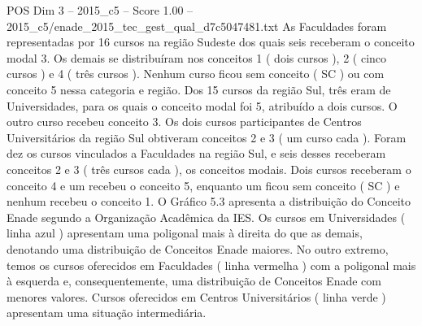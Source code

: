 \begin{textsample}{POS Dim 3 – 2015\_c5 – Score 1.00 – 2015\_c5/enade\_2015\_tec\_gest\_qual\_d7c5047481.txt}
As Faculdades foram representadas por 16 cursos na região Sudeste dos quais seis receberam o conceito modal 3.
Os demais se distribuíram nos conceitos 1 ( dois cursos ), 2 ( cinco cursos ) e 4 ( três cursos ).
Nenhum curso ficou sem conceito ( SC ) ou com conceito 5 nessa categoria e região.
Dos 15 cursos da região Sul, três eram de Universidades, para os quais o conceito modal foi 5, atribuído a dois cursos.
O outro curso recebeu conceito 3.
Os dois cursos participantes de Centros Universitários da região Sul obtiveram conceitos 2 e 3 ( um curso cada ).
Foram dez os cursos vinculados a Faculdades na região Sul, e seis desses receberam conceitos 2 e 3 ( três cursos cada ), os conceitos modais.
Dois cursos receberam o conceito 4 e um recebeu o conceito 5, enquanto um ficou sem conceito ( SC ) e nenhum recebeu o conceito 1.
O Gráfico 5.3 apresenta a distribuição do Conceito Enade segundo a Organização Acadêmica da IES.
Os cursos em Universidades ( linha azul ) apresentam uma poligonal mais à direita do que as demais, denotando uma distribuição de Conceitos Enade maiores.
No outro extremo, temos os cursos oferecidos em Faculdades ( linha vermelha ) com a poligonal mais à esquerda e, consequentemente, uma distribuição de Conceitos Enade com menores valores.
Cursos oferecidos em Centros Universitários ( linha verde ) apresentam uma situação intermediária.

\end{textsample}
